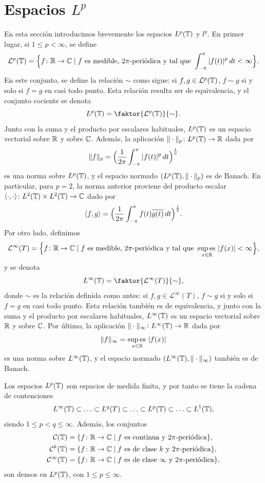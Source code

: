 \documentclass[a4paper, 12pt, oneside]{book}
\begin{document}
\section[Espacios \texorpdfstring{$L^p$}{Lp}]{Espacios \texorpdfstring{\boldmath$L^p$}{Lp}}

En esta sección introducimos brevemente los espacios $L^p(\mathbb T)$ y $l^p$. En primer lugar, si $1 \leq p < \infty$, se define
\[\mathcal{L}^p(\mathbb T) = \Bigl\{f \colon \mathbb R \to \mathbb C \mid f \textup{ es medible, } 2\pi\textup{-periódica y tal que } \int_{-\pi}^{\pi} |f(t)|^p \, dt < \infty \Bigr\}.\]
En este conjunto, se define la relación $\sim$ como sigue: si $f,g \in \mathcal{L}^p(\mathbb T)$, $f \sim g$ si y solo si $f = g$ en casi todo punto. Esta relación resulta ser de equivalencia, y el conjunto cociente se denota
\[L^p(\T) = \faktor{\mathcal{L}^p(\T)}{\sim}.\]
Junto con la suma y el producto por escalares habituales, $L^p(\mathbb T)$ es un espacio vectorial sobre $\mathbb R$ y sobre $\mathbb C$. Además, la aplicación $\|\cdot\|_p \colon L^p(\mathbb T) \to \mathbb R$ dada por
\[\|f\|_{p} = \Bigl(\frac{1}{2\pi}\int_{-\pi}^{\pi} |f(t)|^p \, dt\Bigr)^{\frac{1}{p}}\]
es una norma sobre $L^p(\mathbb T)$, y el espacio normado $(L^p(\mathbb T),\|\cdot\|_p)$ es de Banach. En particular, para $p=2$, la norma anterior proviene del producto escalar $\langle \cdot,\cdot\rangle \colon L^2(\mathbb T)\times L^2(\mathbb T)\to \mathbb C$ dado por
\[\langle f,g\rangle = \Bigl(\frac{1}{2\pi}\int_{-\pi}^{\pi} f(t)\overline{g(t)} \, dt\Bigr)^{\frac{1}{2}}.\]
Por otro lado, definimos
\[\mathcal{L}^\infty(T) = \Bigl\{f \colon \mathbb R \to \mathbb C \mid f \textup{ es medible, } 2\pi\textup{-periódica y tal que } \operatorname*{sup\,es\,}_{x \in \mathbb R} |f(x)| < \infty\Bigr\},\]
y se denota
\[L^\infty(\T) = \faktor{\mathcal{L}^\infty(T)}{\sim},\]
donde $\sim$ es la relación definida como antes: si $f,g \in \mathcal{L}^\infty(T)$, $f \sim g$ si y solo si $f=g$ en casi todo punto. Esta relación también es de equivalencia, y junto con la suma y el producto por escalares habituales, $L^\infty(\mathbb T)$ es un espacio vectorial sobre $\mathbb R$ y sobre $\mathbb C$. Por último, la aplicación $\|\cdot\|_\infty \colon L^\infty(\mathbb T) \to \mathbb R$ dada por
\[\|f\|_{\infty} = \operatorname*{sup\,es\,}_{x \in \mathbb R} |f(x)|\]
es una norma sobre $L^\infty(\mathbb T)$, y el espacio normado $(L^\infty(\mathbb T),\|\cdot\|_\infty)$ también es de Banach.

Los espacios $L^p(\mathbb T)$ son espacios de medida finita, y por tanto se tiene la cadena de contenciones
\[L^\infty(\mathbb T) \subset \mathellipsis \subset L^q(T) \subset \mathellipsis \subset L^p(\mathbb T) \subset \mathellipsis \subset L^1(\mathbb T),\]
siendo $1 \leq p < q \leq \infty$.
Además, los conjuntos
\begin{align*}
    \mathcal{C}(\mathbb T) &= \{f \colon \mathbb R \to \mathbb C \mid f \textup{ es continua y } 2\pi \textup{-periódica}\}, \\
    \mathcal{C}^k(\mathbb T) &= \{f \colon \mathbb R \to \mathbb C \mid f \textup{ es de clase } k \textup{ y } 2\pi \textup{-periódica}\},
    \\
    \mathcal{C}^\infty(\mathbb T) &= \{f \colon \mathbb R \to \mathbb C \mid f \textup{ es de clase } \infty \textup{ y } 2\pi \textup{-periódica}\},
\end{align*}
son densos en $L^p(\mathbb T)$, con $1 \leq p \leq \infty$.
\end{document}
